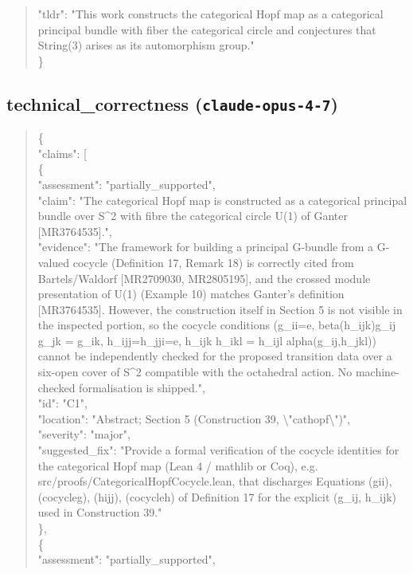 \documentclass[11pt]{article}
\begin{document}
\begin{quote}
  "tldr": "This work constructs the categorical Hopf map as a categorical principal bundle with fiber the categorical circle and conjectures that String(3) arises as its automorphism group."\\
\}\\
\end{quote}

\subsection*{technical\_correctness (\texttt{claude-opus-4-7})}
\begin{quote}\small\ttfamily\raggedright
\{\\
  "claims": [\\
    \{\\
      "assessment": "partially\_supported",\\
      "claim": "The categorical Hopf map is constructed as a categorical principal bundle over S\^{}2 with fibre the categorical circle U(1) of Ganter [MR3764535].",\\
      "evidence": "The framework for building a principal G-bundle from a G-valued cocycle (Definition 17, Remark 18) is correctly cited from Bartels/Waldorf [MR2709030, MR2805195], and the crossed module presentation of U(1) (Example 10) matches Ganter's definition [MR3764535]. However, the construction itself in Section 5 is not visible in the inspected portion, so the cocycle conditions (g\_ii=e, beta(h\_ijk)g\_ij g\_jk = g\_ik, h\_ijj=h\_jji=e, h\_ijk h\_ikl = h\_ijl alpha(g\_ij,h\_jkl)) cannot be independently checked for the proposed transition data over a six-open cover of S\^{}2 compatible with the octahedral action. No machine-checked formalisation is shipped.",\\
      "id": "C1",\\
      "location": "Abstract; Section 5 (Construction 39, \textbackslash{}"cathopf\textbackslash{}")",\\
      "severity": "major",\\
      "suggested\_fix": "Provide a formal verification of the cocycle identities for the categorical Hopf map (Lean 4 / mathlib or Coq), e.g. src/proofs/CategoricalHopfCocycle.lean, that discharges Equations (gii), (cocycleg), (hijj), (cocycleh) of Definition 17 for the explicit (g\_ij, h\_ijk) used in Construction 39."\\
    \},\\
    \{\\
      "assessment": "partially\_supported",\\

\end{quote}
\end{document}
